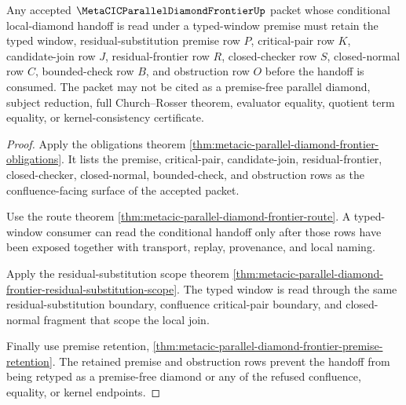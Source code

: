 \begin{theorem}
\label{thm:metacic-parallel-diamond-typed-boundary}
Any accepted $\MetaCICParallelDiamondFrontierUp$ packet whose conditional local-diamond handoff is read under a typed-window premise must retain the typed window, residual-substitution premise row $P$, critical-pair row $K$, candidate-join row $J$, residual-frontier row $R$, closed-checker row $S$, closed-normal row $C$, bounded-check row $B$, and obstruction row $O$ before the handoff is consumed. The packet may not be cited as a premise-free parallel diamond, subject reduction, full Church--Rosser theorem, evaluator equality, quotient term equality, or kernel-consistency certificate.
\end{theorem}
\begin{proof}
Apply the obligations theorem \autoref{thm:metacic-parallel-diamond-frontier-obligations}. It lists the premise, critical-pair, candidate-join, residual-frontier, closed-checker, closed-normal, bounded-check, and obstruction rows as the confluence-facing surface of the accepted packet.

Use the route theorem \autoref{thm:metacic-parallel-diamond-frontier-route}. A typed-window consumer can read the conditional handoff only after those rows have been exposed together with transport, replay, provenance, and local naming.

Apply the residual-substitution scope theorem \autoref{thm:metacic-parallel-diamond-frontier-residual-substitution-scope}. The typed window is read through the same residual-substitution boundary, confluence critical-pair boundary, and closed-normal fragment that scope the local join.

Finally use premise retention, \autoref{thm:metacic-parallel-diamond-frontier-premise-retention}. The retained premise and obstruction rows prevent the handoff from being retyped as a premise-free diamond or any of the refused confluence, equality, or kernel endpoints.
\end{proof}

